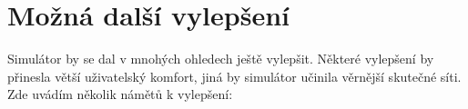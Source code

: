 \chapter{Možná další vylepšení}

Simulátor by se dal v mnohých ohledech ještě vylepšit. Některé vylepšení by přinesla větší uživatelský komfort, jiná by simulátor učinila věrnější skutečné síti. Zde uvádím několik námětů k vylepšení:

% 
% 
% 
% 

